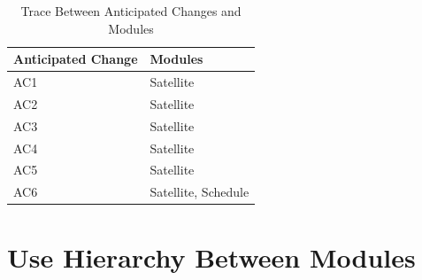 \documentclass[12pt, titlepage]{article}
\newcommand{\mref}[1]{M\ref{#1}}
\begin{document}
 

\begin{table}[H]
\centering
\begin{tabular}{p{} p{}}
\toprule
Anticipated Change
& Modules
\\
\midrule

AC1
& Satellite
\\
AC2
& Satellite
\\
AC3
& Satellite
\\
AC4
& Satellite
\\
AC5
& Satellite
\\
AC6
& Satellite, Schedule
\\
\bottomrule
\end{tabular}
\caption{Trace Between Anticipated Changes and Modules}
\label{TblACT}
\end{table}

\section{Use Hierarchy Between Modules} \label{SecUse}
\end{document}
